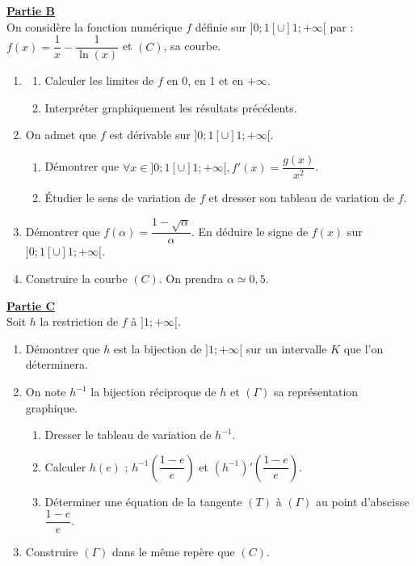 \documentclass[12pt,a4paper]{article}
\begin{document}
\vspace{0.5cm}

\noindent \underline{\textbf{Partie B}} \\
On considère la fonction numérique $f$ définie sur $]0; 1[ \cup ]1; +\infty[$ par : $f(x) = \dfrac{1}{x} - \dfrac{1}{\ln(x)}$ et $(C)$, sa courbe.

\begin{enumerate}
    \item \begin{enumerate}
        \item Calculer les limites de $f$ en 0, en 1 et en $+\infty$.
        \item Interpréter graphiquement les résultats précédents.
    \end{enumerate}
    \item On admet que $f$ est dérivable sur $]0; 1[ \cup ]1; +\infty[$.
    \begin{enumerate}
        \item Démontrer que $\forall x \in ]0; 1[ \cup ]1; +\infty[ , f'(x) = \dfrac{g(x)}{x^2}$.
        \item Étudier le sens de variation de $f$ et dresser son tableau de variation de $f$.
    \end{enumerate}
    \item Démontrer que $f(\alpha) = \dfrac{1 - \sqrt{\alpha}}{\alpha}$. En déduire le signe de $f(x)$ sur $]0; 1[ \cup ]1; +\infty[$.
     \item Construire la courbe $(C)$. On prendra $\alpha \simeq 0,5$.
\end{enumerate}

\vspace{0.5cm}

\noindent \underline{\textbf{Partie C}} \\
Soit $h$ la restriction de $f$ à $]1; +\infty[$.

\begin{enumerate}
    \item Démontrer que $h$ est la bijection de $]1; +\infty[$ sur un intervalle $K$ que l'on déterminera.
    \item On note $h^{-1}$ la bijection réciproque de $h$ et $(\Gamma)$ sa représentation graphique.
    \begin{enumerate}
        \item Dresser le tableau de variation de $h^{-1}$.
        \item Calculer $h(e)$ ; $h^{-1}\left( \dfrac{1-e}{e}\right) $ et $(h^{-1})'\left( \dfrac{1-e}{e}\right) $.
        \item Déterminer une équation de la tangente $(T)$ à $(\Gamma)$ au point d'abscisse $\dfrac{1-e}{e}$.
    \end{enumerate}
    \item Construire $(\Gamma)$ dans le même repère que $(C)$.
\end{enumerate}
\end{document}
